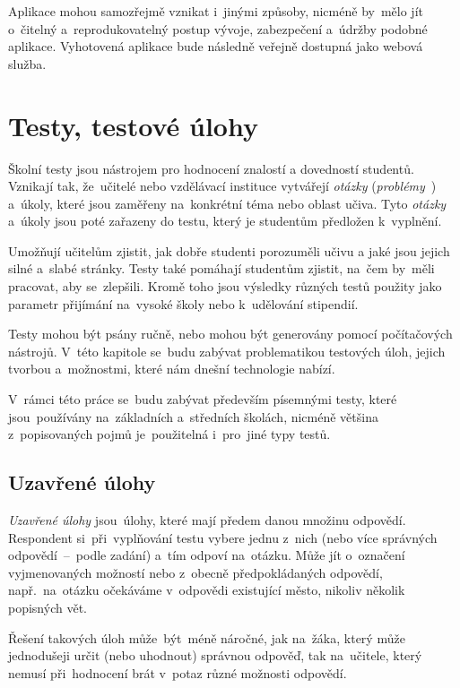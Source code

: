 \documentclass[10pt,a4paper]{article}
\begin{document}
    Aplikace mohou samozřejmě vznikat i~jinými způsoby, nicméně by~mělo jít o~čitelný a~reprodukovatelný postup vývoje, zabezpečení a~údržby podobné aplikace. Vyhotovená aplikace bude následně veřejně dostupná jako webová služba.

    \section{Testy, testové úlohy}

    Školní testy jsou nástrojem pro hodnocení znalostí a dovedností studentů. Vznikají tak, že~učitelé nebo vzdělávací instituce vytvářejí \emph{otázky} (\emph{problémy}~\cite{zhouf:tvorbamatproblemu}) a~úkoly, které jsou zaměřeny na~konkrétní téma nebo oblast učiva. Tyto \emph{otázky} a~úkoly jsou poté zařazeny do testu, který je studentům předložen k~vyplnění.

    Umožňují učitelům zjistit, jak dobře studenti porozuměli učivu a jaké jsou jejich silné a~slabé stránky. Testy také pomáhají studentům zjistit, na~čem by~měli pracovat, aby se~zlepšili. Kromě toho jsou výsledky různých testů použity jako parametr přijímání na~vysoké školy nebo k~udělování stipendií.
    
    Testy mohou být psány ručně, nebo mohou být generovány pomocí počítačových nástrojů. V~této kapitole se~budu zabývat problematikou testových úloh, jejich tvorbou a~možnostmi, které nám dnešní technologie nabízí.

    V~rámci této práce se~budu zabývat především písemnými testy, které jsou~používány na~základních a~středních školách, nicméně většina z~popisovaných pojmů je~použitelná i~pro~jiné typy testů.

        \subsection{Uzavřené úlohy}
        
        \emph{Uzavřené úlohy} jsou~úlohy, které mají předem danou množinu odpovědí. Respondent si~při~vyplňování testu vybere jednu z~nich (nebo více správných odpovědí~--~podle zadání) a~tím odpoví na~otázku. Může jít o~označení vyjmenovaných možností nebo z~obecně předpokládaných odpovědí, např.~na~otázku  očekáváme v~odpovědi existující město, nikoliv několik popisných vět.

        Řešení takových úloh může~být~méně náročné, jak na~žáka, který může jednodušeji určit (nebo uhodnout) správnou odpověď, tak na~učitele, který nemusí při~hodnocení brát v~potaz různé možnosti odpovědí.
\end{document}
